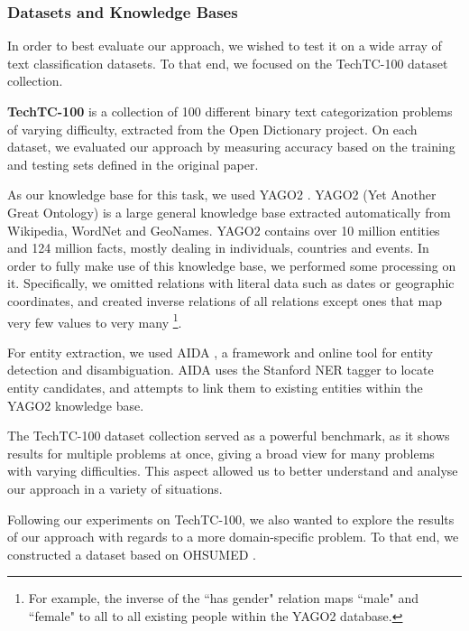 \documentclass[twoside,11pt]{article}
\theoremstyle{definition}
\begin{document}
\subsubsection{Datasets and Knowledge Bases}

In order to best evaluate our approach, we wished to test it on a wide array of text classification datasets. To that end, we focused on the TechTC-100 \cite{gabrilovich2004text} dataset collection.

\textbf{TechTC-100} is a collection of 100 different binary text categorization problems of varying difficulty, extracted from the Open Dictionary project.
On each dataset, we evaluated our approach  by measuring accuracy based on the training and testing sets defined in the original paper. 

As our knowledge base for this task, we used YAGO2 \cite{hoffart2013yago2}.
YAGO2 (Yet Another Great Ontology) is a large general knowledge base extracted automatically from Wikipedia, WordNet and GeoNames.
YAGO2 contains over 10 million entities and 124 million facts, mostly dealing in individuals, countries and events.
In order to fully make use of this knowledge base, we performed some processing on it. Specifically, we omitted relations with literal data such as dates or geographic coordinates, and created inverse relations of all relations except ones that map very few values to very many \footnote{For example, the inverse of the ``has gender" relation  maps ``male" and ``female" to all to all existing people within the YAGO2 database.}.

For entity extraction, we used AIDA , a framework and online tool for entity detection and disambiguation. AIDA uses the Stanford NER tagger \cite{finkel2005incorporatingfull} to locate entity candidates, and attempts to link them to existing entities within the YAGO2 knowledge base.

The TechTC-100 dataset collection served as a powerful benchmark, as it shows results for multiple problems at once, giving a broad view for many problems with varying difficulties. This aspect allowed us to better understand and analyse our approach in a variety of situations.

Following our experiments on TechTC-100, we also wanted to explore the results of our approach with regards to a more domain-specific problem.
To that end, we constructed a dataset based on OHSUMED .
\end{document}
